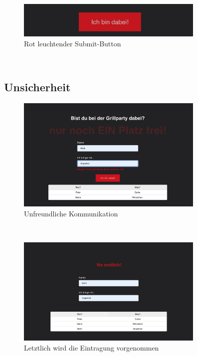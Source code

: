 \documentclass[./dokumentation.tex]{subfiles}
\begin{document}
\begin{figure}[h]
    \centering
    \includegraphics[width=0.8\textwidth]{bilder/rot-dabei.png}
    \caption{Rot leuchtender Submit-Button}
    \label{fig15:submit}
\end{figure}\\


\subsection{Unsicherheit}

\begin{figure}[H]
    \centering
    \includegraphics[width=0.8\textwidth]{bilder/ekelhaft.png}
    \caption{Unfreundliche Kommunikation} %
    \label{fig16:ekel}
\end{figure}\\


\begin{figure}[h]
    \centering
    \includegraphics[width=0.8\textwidth]{bilder/na-endlich.png}
    \caption{Letztlich wird die Eintragung vorgenommen}
    \label{fig17:okay}
\end{figure}\\
\end{document}

